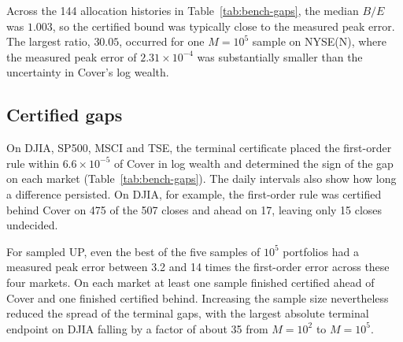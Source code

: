 \documentclass{article}
\numberwithin{equation}{section}
\theoremstyle{remark}
\begin{document}
Across the 144 allocation histories in Table~\ref{tab:bench-gaps}, the
median $B/E$ was $1.003$, so the certified bound was typically close to
the measured peak error. The largest ratio, $30.05$, occurred for one
$M=10^5$ sample on NYSE(N), where the measured peak error of
$2.31\times10^{-4}$ was substantially smaller than the uncertainty in
Cover's log wealth.

\subsection{Certified gaps}\label{sec:bench-gaps}
On DJIA, SP500, MSCI and TSE, the terminal certificate placed the
first-order rule within $6.6\times10^{-5}$ of Cover in log wealth and
determined the sign of the gap on each market
(Table~\ref{tab:bench-gaps}). The daily intervals also show how long a
difference persisted. On DJIA, for example, the first-order rule was
certified behind Cover on 475 of the 507 closes and ahead on 17, leaving
only 15 closes undecided.

For sampled UP, even the best of the five samples of $10^5$ portfolios
had a measured peak error between 3.2 and 14 times the first-order
error across these four markets. On each market at least one sample
finished certified ahead of Cover and one finished certified behind.
Increasing the sample size nevertheless reduced the spread of the
terminal gaps, with the largest absolute terminal endpoint on DJIA
falling by a factor of about 35 from $M=10^2$ to $M=10^5$.
\end{document}

